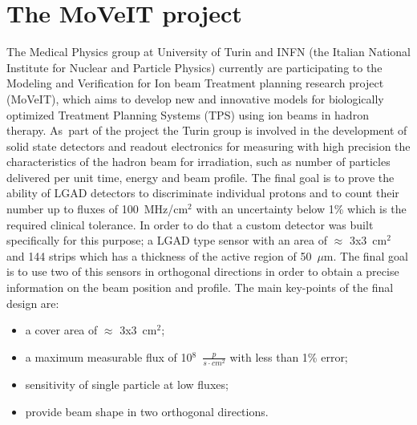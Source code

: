 \section{The MoVeIT project}\label{moveit}
\noindent The Medical Physics group at University of Turin and INFN (the Italian National Institute for Nuclear and Particle Physics) currently are participating to the Modeling and Verification for Ion beam Treatment planning research project (MoVeIT), which aims to develop new and innovative models for biologically optimized Treatment Planning Systems (TPS) using ion beams in hadron therapy\cite{moveit}.
As~part of the project the Turin group is involved in the development of solid state detectors and readout electronics for measuring with high precision
the characteristics of the hadron beam for irradiation, such as number of particles delivered per unit time, energy and beam profile.
The final goal is to prove the ability of LGAD detectors to discriminate individual protons and to count their number up to fluxes of 100~MHz/cm$^2$ with an uncertainty below 1\% which is the required clinical tolerance.
In order to do that a custom detector was built specifically for this purpose; a LGAD type sensor with an area of $\approx$ 3x3~cm$^2$ and 144 strips which has a thickness of the active region of 50~$\mu$m.
The final goal is to use two of this sensors in orthogonal directions in order to obtain a precise information on the beam position and profile\cite{hammad}.
The main key-points of the final design are:
\begin{itemize}
	\item a cover area of $\approx$ 3x3~cm$^2$;
	\item a maximum measurable flux of 10$^8$~$\frac{p}{s \cdot cm^2}$ with less than 1\% error;
	\item sensitivity of single particle at low fluxes;
	\item provide beam shape in two orthogonal directions.
\end{itemize}


